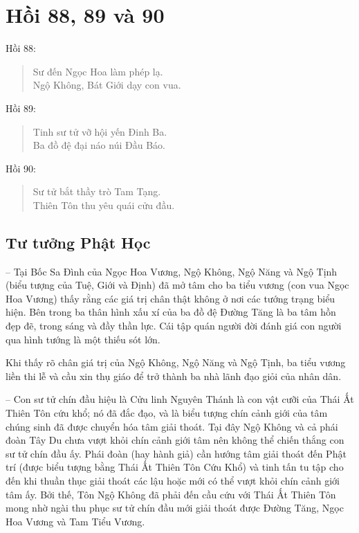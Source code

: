 \chapter{Hồi 88, 89 và 90} %
\label{cha:hoi_88_89_90}

Hồi 88:

\begin{verse}
\begin{itshape}
Sư đến Ngọc Hoa làm phép lạ.\\
Ngộ Không, Bát Giới dạy con vua.
\end{itshape}
\end{verse}

Hồi 89:

\begin{verse}
\begin{itshape}
Tinh sư tử vỡ hội yến Đinh Ba.\\
Ba đồ đệ đại náo núi Đầu Báo.
\end{itshape}
\end{verse}

Hồi 90:

\begin{verse}
\begin{itshape}
Sư tử bắt thầy trò Tam Tạng.\\
Thiên Tôn thu yêu quái cửu đầu.
\end{itshape}
\end{verse}

\section{Tư tưởng Phật Học} %
\label{sec:88_89_90_phat_hoc}

-- Tại Bốc Sa Đình của Ngọc Hoa Vương, Ngộ Không, Ngộ Năng và Ngộ Tịnh (biểu tượng của Tuệ, Giới và Định) đã mở tâm cho ba tiểu vương (con vua Ngọc Hoa Vương) thấy rằng các giá trị chân thật không ở nơi các tướng trạng biểu hiện. Bên trong ba thân hình xấu xí của ba đồ đệ Đường Tăng là ba tâm hồn đẹp đẽ, trong sáng và đầy thần lực. Cái tập quán người đời đánh giá con người qua hình tướng là một thiếu sót lớn.

Khi thấy rõ chân giá trị của Ngộ Không, Ngộ Năng và Ngộ Tịnh, ba tiểu vương liền thi lễ và cầu xin thụ giáo để trở thành ba nhà lãnh đạo giỏi của nhân dân.

-- Con sư tử chín đầu hiệu là Cửu linh Nguyên Thánh là con vật cưỡi của Thái Ất Thiên Tôn cứu khổ; nó đã đắc đạo, và là biểu tượng chín cảnh giới của tâm chúng sinh đã được chuyển hóa tâm giải thoát. Tại đây Ngộ Không và cả phái đoàn Tây Du chưa vượt khỏi chín cảnh giới tâm nên không thể chiến thắng con sư tử chín đầu ấy. Phái đoàn (hay hành giả) cần hướng tâm giải thoát đến Phật trí (được biểu tượng bằng Thái Ất Thiên Tôn Cứu Khổ) và tinh tấn tu tập cho đến khi thuần thục giải thoát các lậu hoặc mới có thể vượt khỏi chín cảnh giới tâm ấy. Bởi thế, Tôn Ngộ Không đã phải đến cầu cứu với Thái Ất Thiên Tôn mong nhờ ngài thu phục sư tử chín đầu mới giải thoát được Đường Tăng, Ngọc Hoa Vương và Tam Tiểu Vương.

